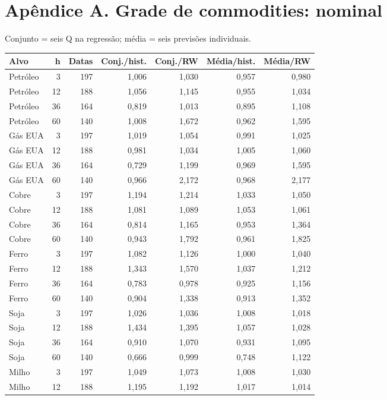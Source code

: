 \documentclass[11pt,a4paper]{article}
\begin{document}
\section*{Apêndice A. Grade de commodities: nominal}Conjunto = seis Q na regressão; média = seis previsões individuais.\par \footnotesize\begin{center}\begin{tabular}{lrrrrrr}\toprule
Alvo & h & Datas & Conj./hist. & Conj./RW & Média/hist. & Média/RW \\ \midrule
Petróleo & 3 & 197 & 1,006 & 1,030 & 0,957 & 0,980 \\
Petróleo & 12 & 188 & 1,056 & 1,145 & 0,955 & 1,034 \\
Petróleo & 36 & 164 & 0,819 & 1,013 & 0,895 & 1,108 \\
Petróleo & 60 & 140 & 1,008 & 1,672 & 0,962 & 1,595 \\
Gás EUA & 3 & 197 & 1,019 & 1,054 & 0,991 & 1,025 \\
Gás EUA & 12 & 188 & 0,981 & 1,034 & 1,005 & 1,060 \\
Gás EUA & 36 & 164 & 0,729 & 1,199 & 0,969 & 1,595 \\
Gás EUA & 60 & 140 & 0,966 & 2,172 & 0,968 & 2,177 \\
Cobre & 3 & 197 & 1,194 & 1,214 & 1,033 & 1,050 \\
Cobre & 12 & 188 & 1,081 & 1,089 & 1,053 & 1,061 \\
Cobre & 36 & 164 & 0,814 & 1,165 & 0,953 & 1,364 \\
Cobre & 60 & 140 & 0,943 & 1,792 & 0,961 & 1,825 \\
Ferro & 3 & 197 & 1,082 & 1,126 & 1,000 & 1,040 \\
Ferro & 12 & 188 & 1,343 & 1,570 & 1,037 & 1,212 \\
Ferro & 36 & 164 & 0,783 & 0,978 & 0,925 & 1,156 \\
Ferro & 60 & 140 & 0,904 & 1,338 & 0,913 & 1,352 \\
Soja & 3 & 197 & 1,026 & 1,036 & 1,008 & 1,018 \\
Soja & 12 & 188 & 1,434 & 1,395 & 1,057 & 1,028 \\
Soja & 36 & 164 & 0,910 & 1,070 & 0,931 & 1,095 \\
Soja & 60 & 140 & 0,666 & 0,999 & 0,748 & 1,122 \\
Milho & 3 & 197 & 1,049 & 1,073 & 1,008 & 1,030 \\
Milho & 12 & 188 & 1,195 & 1,192 & 1,017 & 1,014 \\

\end{tabular}
\end{center}
\end{document}

